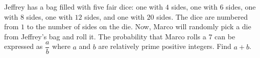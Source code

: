 Jeffrey has a bag filled with five fair dice: one with $4$ sides, one with $6$ sides, one with $8$ sides, one with $12$ sides, and one with $20$ sides. The dice are numbered from $1$ to the number of sides on the die. Now, Marco will randomly pick a die from Jeffrey's bag and roll it. The probability that Marco rolls a $7$ can be expressed as  $\dfrac{a}{b}$ where $a$ and $b$ are relatively prime positive integers. Find $a+b$.

